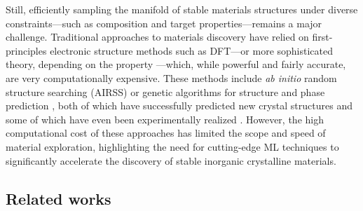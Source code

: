 Still, efficiently sampling the manifold of stable materials structures under diverse constraints---such as composition and target properties---remains a major challenge. Traditional approaches to materials discovery have relied on first-principles electronic structure methods such as DFT---or more sophisticated theory, depending on the property \citep{booth2013towards, PhysRevB.89.205427, PhysRevB.102.045146}---which, while powerful and fairly accurate, are very computationally expensive. These methods include \textit{ab initio} random structure searching (AIRSS) \citep{pickard_initio_2011} or genetic algorithms for structure and phase prediction \citep{tipton_grand_2013}, both of which have successfully predicted new crystal structures and some of which have even been experimentally realized \citep{oganov_structure_2019}.
However, the high computational cost of these approaches has limited the scope and speed of material exploration, highlighting the need for cutting-edge ML techniques to significantly accelerate the discovery of stable inorganic crystalline materials.

\subsection{Related works}

